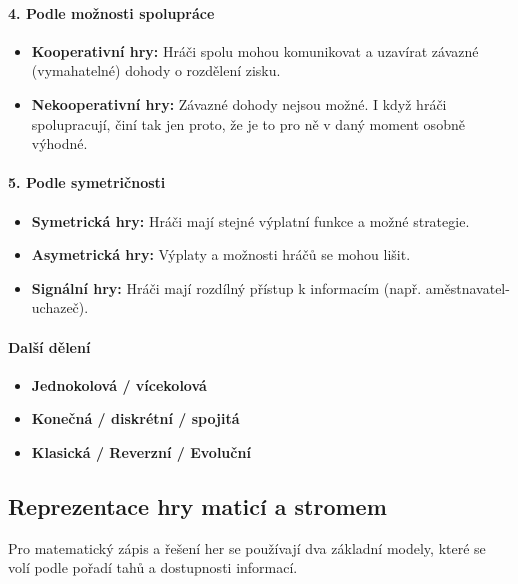 \paragraph*{4. Podle možnosti spolupráce}
\begin{itemize}
    \item \textbf{Kooperativní hry:} Hráči spolu mohou komunikovat a uzavírat závazné (vymahatelné) dohody o rozdělení zisku.
    \item \textbf{Nekooperativní hry:} Závazné dohody nejsou možné. I když hráči spolupracují, činí tak jen proto, že je to pro ně v daný moment osobně výhodné.
\end{itemize}

\paragraph*{5. Podle symetričnosti}
\begin{itemize}
    \item \textbf{Symetrická hry:} Hráči mají stejné výplatní funkce a možné strategie.
    \item \textbf{Asymetrická hry:} Výplaty a možnosti hráčů se mohou lišit.
    \item \textbf{Signální hry:} Hráči mají rozdílný přístup k informacím (např. aměstnavatel-uchazeč).
\end{itemize}

\paragraph*{Další dělení}
\begin{itemize}
    \item \textbf{Jednokolová / vícekolová}
    \item \textbf{Konečná / diskrétní / spojitá}
    \item \textbf{Klasická / Reverzní / Evoluční}
\end{itemize}

\subsection{Reprezentace hry maticí a stromem}
Pro matematický zápis a řešení her se používají dva základní modely, které se volí podle pořadí tahů a dostupnosti informací.

